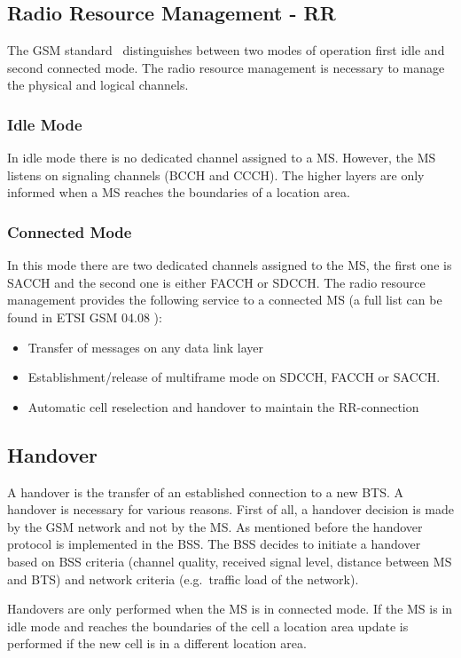 \subsection{Radio Resource Management - RR}
The GSM standard~\cite{Etsi1994} distinguishes between two modes of operation first idle and second connected mode. The radio resource management is necessary to manage the physical and logical channels. 
\subsubsection{Idle Mode}
In idle mode there is no dedicated channel assigned to a MS. However, the MS listens on signaling channels (BCCH and CCCH). The higher layers are only informed when a MS reaches the boundaries of a location area.
\subsubsection{Connected Mode}
\label{subsub:connected}
In this mode there are two dedicated channels assigned to the MS, the first one is SACCH and the second one is either FACCH or SDCCH. 
The radio resource management provides the following service to a connected MS (a full list can be found in ETSI GSM 04.08 \cite{Etsi1994}):
\begin{itemize}
	\item Transfer of messages on any data link layer
	\item Establishment/release of multiframe mode on SDCCH, FACCH or SACCH.
	\item Automatic cell reselection and handover to maintain the RR-connection
\end{itemize}
\subsection{Handover}
A handover is the transfer of an established connection to a new BTS. A handover is necessary for various reasons. First of all, a handover decision is made by the GSM network and not by the MS. As mentioned before the handover protocol is implemented in the BSS. The BSS decides to initiate a handover based on BSS criteria (channel quality, received signal level, distance between MS and BTS) and network criteria (e.g.\ traffic load of the network).

Handovers are only performed when the MS is in connected mode. If the MS is in idle mode and reaches the boundaries of the cell a location area update is performed if the new cell is in a different location area.

